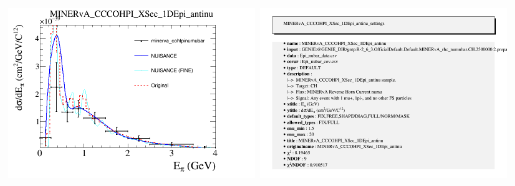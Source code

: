 \documentclass{article}
\begin{document}
\centering
\includegraphics[width=0.49\textwidth]{figures/minerva_cohtpinumubar_comp.png}
\includegraphics[width=0.49\textwidth]{figures/minerva_cohtpinumubar_info.png}
\end{document}
